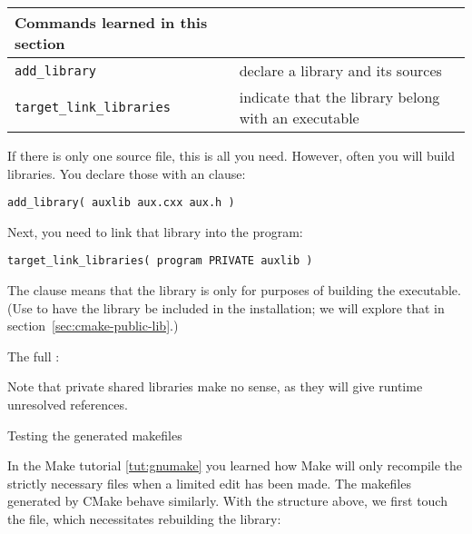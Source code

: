 \begin{tabular}{lp{3in}}
  \toprule
  Commands learned in this section\\
  \midrule
  \lstinline+add_library+&declare a library and its sources\\
  \lstinline+target_link_libraries+&indicate that the library belong with an executable\\
  \bottomrule
\end{tabular}

\begin{floatingfigure}[r]{2.5in}
  \begin{minipage}{2.5in}
  \end{minipage}
\end{floatingfigure}
%
If there is only one source file, this is all you need.
However, often you will build libraries.
You declare those with an  clause:
\begin{lstlisting}
add_library( auxlib aux.cxx aux.h )
\end{lstlisting}
Next, you need to link that library into the program:
\begin{lstlisting}
target_link_libraries( program PRIVATE auxlib )
\end{lstlisting}
The  clause means that the library is only for
purposes of building the executable.
(Use  to have the library be included in the installation;
we will explore that in section~\ref{sec:cmake-public-lib}.)

The full :
%


Note that private shared libraries make no sense, as they will give
runtime unresolved references.

 {Testing the generated makefiles}

In the Make tutorial \ref{tut:gnumake} you learned how Make will only recompile
the strictly necessary files when a limited edit has been made.
The makefiles generated by CMake behave similarly.
With the structure above, we first touch the  file,
which necessitates rebuilding the library:
%



